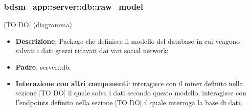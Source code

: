   \subsubsection{bdsm\_app::server::db::raw\_model} %
  \label{ssub:bdsm_app_server_raw_model}
  [TO DO] (diagramma) \newline \newline

  \begin{itemize}
    \item \textbf{Descrizione}: Package che definisce il modello del database in cui vengono salvati i dati grezzi ricavati dai vari social network;
    \item \textbf{Padre}: server::db;
    \item \textbf{Interazione con altri componenti}: interagisce con il miner definito nella sezione [TO DO] il quale salva i dati secondo questo modello, interagisce con l'endpoints definito nella sezione [TO DO] il quale interroga la base di dati;
  \end{itemize}
  		
